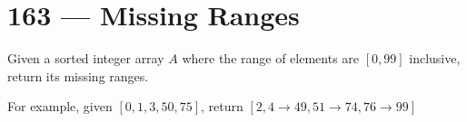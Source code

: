 \section{163 --- Missing Ranges}
Given a sorted integer array $A$ where the range of elements are $[0, 99]$ inclusive, return its missing ranges.
\par
For example, given $[0, 1, 3, 50, 75]$, return $[2, 4\to49, 51\to74, 76\to99]$